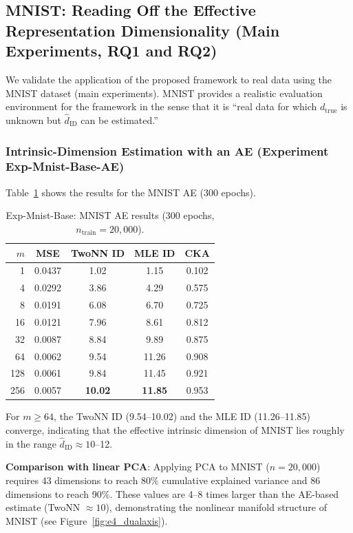 \documentclass[make,article,submit,pdftex,moreauthors]{Definitions/mdpi}
\newcommand{\dtrue}{d_{\mathrm{true}}}
\begin{document}
\subsection{MNIST: Reading Off the Effective Representation Dimensionality (Main Experiments, RQ1 and RQ2)}\label{sec:exp_mnist}

We validate the application of the proposed framework to real data using the MNIST dataset (main experiments).
MNIST provides a realistic evaluation environment for the framework in the sense that it is
``real data for which $\dtrue$ is unknown but $\hat{d}_\mathrm{ID}$ can be estimated.''

\subsubsection{Intrinsic-Dimension Estimation with an AE (Experiment Exp-Mnist-Base-AE)}

Table~\ref{tab:e4_ae} shows the results for the MNIST AE (300 epochs).

\begin{table}[H]
\centering
\caption{Exp-Mnist-Base: MNIST AE results (300 epochs, $n_\mathrm{train}=20{,}000$).}
\label{tab:e4_ae}
\small
\begin{tabular}{rcccc}
\toprule
$m$ & MSE & TwoNN ID & MLE ID & CKA \\
\midrule
1   & 0.0437 & 1.02  & 1.15  & 0.102 \\
4   & 0.0292 & 3.86  & 4.29  & 0.575 \\
8   & 0.0191 & 6.08  & 6.70  & 0.725 \\
16  & 0.0121 & 7.96  & 8.61  & 0.812 \\
32  & 0.0087 & 8.84  & 9.89  & 0.875 \\
64  & 0.0062 & 9.54  & 11.26 & 0.908 \\
128 & 0.0061 & 9.84  & 11.45 & 0.921 \\
256 & 0.0057 & \textbf{10.02} & \textbf{11.85} & 0.953 \\
\bottomrule
\end{tabular}
\end{table}

For $m \geq 64$, the TwoNN ID (9.54--10.02) and the MLE ID (11.26--11.85) converge,
indicating that the effective intrinsic dimension of MNIST lies roughly in the range
$\hat{d}_\mathrm{ID} \approx 10$--12.

\textbf{Comparison with linear PCA}:
Applying PCA to MNIST ($n = 20{,}000$) requires 43 dimensions to reach 80\% cumulative
explained variance and 86 dimensions to reach 90\%.
These values are 4--8 times larger than the AE-based estimate (TwoNN $\approx 10$),
demonstrating the nonlinear manifold structure of MNIST (see Figure~\ref{fig:e4_dualaxis}).
\end{document}
